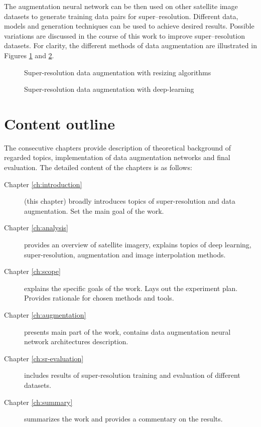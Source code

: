 The augmentation neural network can be then used on other satellite image
datasets to generate training data pairs for super--resolution.
Different data, models and generation techniques can be used to achieve desired
results.
Possible variations are discussed in the course of this work to improve
super--resolution datasets.
For clarity, the different methods of data augmentation are illustrated in Figures \ref{fig:augmentation-resize} and \ref{fig:augmentation-deep-learn}.
\begin{figure}
    \centering
    
    \caption{Super-resolution data augmentation with resizing algorithms}
    \label{fig:augmentation-resize}
\end{figure}
\begin{figure}
    \centering
    
    \caption{Super-resolution data augmentation with deep-learning}
    \label{fig:augmentation-deep-learn}
\end{figure}

\section{Content outline}
The consecutive chapters provide description of theoretical background of regarded topics, implementation of data augmentation networks and final evaluation.
The detailed content of the chapters is as follows:
\begin{description}
	\item [Chapter \ref{ch:introduction}] (this chapter) broadly introduces topics of super-resolution and data augmentation. Set the main goal of the work.
	\item [Chapter \ref{ch:analysis}] provides an overview of satellite imagery, explains topics of deep learning, super-resolution, augmentation and image interpolation methods.
	\item [Chapter \ref{ch:scope}] explains the specific goals of the work. Lays out the experiment plan. Provides rationale for chosen methods and tools.
	\item [Chapter \ref{ch:augmentation}] presents main part of the work, contains data augmentation neural network architectures description.
	\item [Chapter \ref{ch:sr-evaluation}] includes results of super-resolution training and evaluation of different datasets.
	\item [Chapter \ref{ch:summary}] summarizes the work and provides a commentary on the results.
\end{description}
